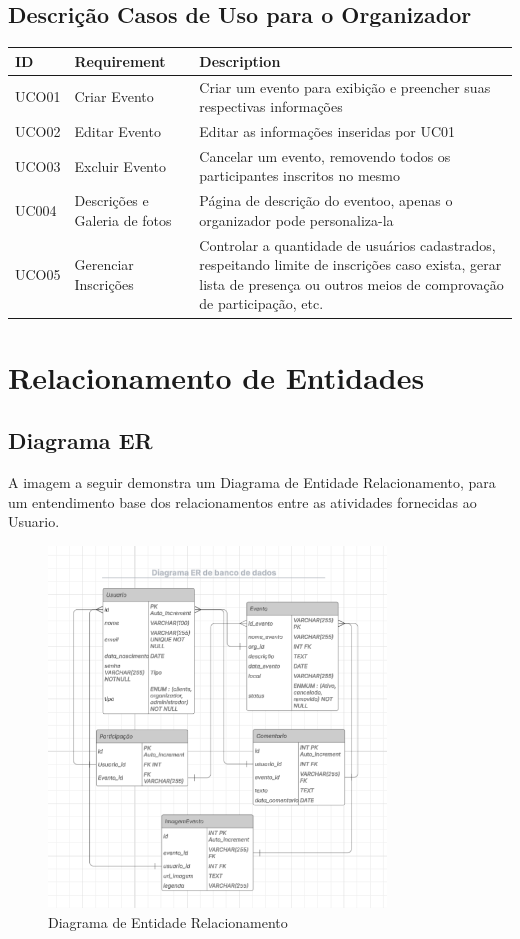 \section{Descrição Casos de Uso para o Organizador}
\begin{tabular}{>{\raggedright}p{1.5cm}>{\raggedright}p{4cm}>{\raggedright}p{10cm}}
\toprule
\textbf{ID} & \textbf{Requirement} & \textbf{Description} \tabularnewline 
\midrule
  UCO01 & Criar Evento & Criar um evento para exibição e preencher suas respectivas informações \tabularnewline \hline
  UCO02 & Editar Evento & Editar as informações inseridas por UC01\tabularnewline \hline
  UCO03 & Excluir Evento & Cancelar um evento, removendo todos os participantes inscritos no mesmo\tabularnewline \hline
  UC004 & Descrições e Galeria de fotos & Página de descrição do eventoo, apenas o organizador pode personaliza-la\tabularnewline \hline
  UCO05 & Gerenciar Inscrições & Controlar a quantidade de usuários cadastrados, respeitando limite de inscrições caso exista, gerar lista de presença ou outros meios de comprovação de participação, etc. \tabularnewline 
\bottomrule
\end{tabular}

\chapter{Relacionamento de Entidades}

\section{Diagrama ER}
A imagem a seguir demonstra um Diagrama de Entidade Relacionamento, para um entendimento base dos relacionamentos entre as atividades fornecidas ao Usuario.

\begin{figure}[H]
  \centering
  \includegraphics[width=0.8\textwidth]{images/diagrama_ER.png}
  \caption{Diagrama de Entidade Relacionamento}
  \label{fig:diagram_Entity_Relatioship}
\end{figure}


